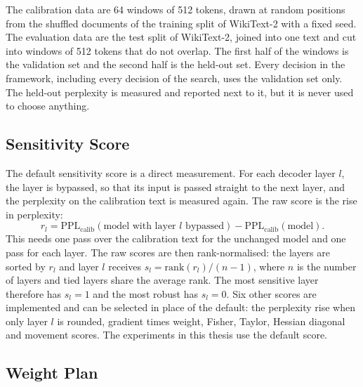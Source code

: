 The calibration data are 64 windows of 512 tokens, drawn at random positions from the shuffled documents of the training split of WikiText-2 with a fixed seed. The evaluation data are the test split of WikiText-2, joined into one text and cut into windows of 512 tokens that do not overlap. The first half of the windows is the validation set and the second half is the held-out set. Every decision in the framework, including every decision of the search, uses the validation set only. The held-out perplexity is measured and reported next to it, but it is never used to choose anything.

\subsection{Sensitivity Score}
\label{sec:ch4-score}

The default sensitivity score is a direct measurement. For each decoder layer $l$, the layer is bypassed, so that its input is passed straight to the next layer, and the perplexity on the calibration text is measured again. The raw score is the rise in perplexity:
\begin{equation}
  r_l = \mathrm{PPL}_{\mathrm{calib}}(\text{model with layer } l \text{ bypassed}) - \mathrm{PPL}_{\mathrm{calib}}(\text{model}).
  \label{eq:ch4-score}
\end{equation}
This needs one pass over the calibration text for the unchanged model and one pass for each layer. The raw scores are then rank-normalised: the layers are sorted by $r_l$ and layer $l$ receives $s_l = \mathrm{rank}(r_l) / (n - 1)$, where $n$ is the number of layers and tied layers share the average rank. The most sensitive layer therefore has $s_l = 1$ and the most robust has $s_l = 0$. Six other scores are implemented and can be selected in place of the default: the perplexity rise when only layer $l$ is rounded, gradient times weight, Fisher, Taylor, Hessian diagonal and movement scores. The experiments in this thesis use the default score.

\subsection{Weight Plan}
\label{sec:ch4-weightplan}

